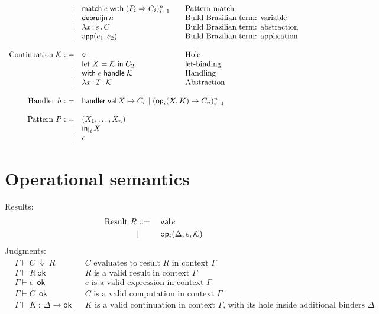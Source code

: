 \documentclass{article}
\newcommand{\G}{\Gamma}
\newcommand{\D}{\Delta}
\newcommand{\bnf}{\mathrel{{:}{:}{=}}}
\newcommand{\bnfor}{|}
\newcommand{\x}{x}     %
\newcommand{\C}{C}     %
\newcommand{\K}{K}     %
\newcommand{\X}{X}     %
\newcommand{\e}{e}     %
\newcommand{\rgn}{r}   %
\newcommand{\h}{h}     %
\newcommand{\T}{T}     %
\newcommand{\KK}{{\cal K}} %
\newcommand{\val}{\mathsf{val}\,} %
\newcommand{\letin}[1]{\mathsf{let}\; #1 \;\mathsf{in}\;} %
\newcommand{\opPat}[3][i]{\mathsf{op}_{#1}(#2, #3)} %
\newcommand{\opRes}[4][i]{\mathsf{op}_{#1}(#2, #3, #4)} %
\newcommand{\withhandle}[1]{\mathsf{with}\;#1\;\mathsf{handle}\;} %
\newcommand{\abs}[1]{\mathsf{abs}\;#1\;\mathsf{in}\;} %
\newcommand{\lam}[2]{\lambda #1 \,{:}\, #2 \,.\,} %
\newcommand{\handler}[6][n]{\mathsf{handler}\; \val #2 \mapsto #3 \mid (\opPat{#4}{#5} \mapsto #6_{#1})_{i=1}^{#1}}
\newcommand{\makeApp}[2]{\mathsf{app}(#1,#2)} %
\newcommand{\debruijn}[1]{\mathsf{debruijn}\,#1} %
\newcommand{\hole}{\diamond}
\newcommand{\tuple}[1]{(#1)}
\newcommand{\pat}{P}
\newcommand{\match}[2]{\mathsf{match}\; #1\; \mathsf{with}\;#2}
\newcommand{\genericPats}[1][n]{(\pat_i \Rightarrow \C_i)_{i=1}^n}
\newcommand{\genericmatch}[1][\e]{\match{#1}{\genericPats}}
\renewcommand{\c}{c} %
\newcommand{\inj}[2][i]{\mathsf{inj}_{#1}\, #2}
\newcommand{\evalto}[3][\G]{#1 \vdash #2 \ \Downarrow\  #3}
\newcommand{\resultok}[2][\G]{#1 \vdash #2 \ \mathsf{ok}}
\newcommand{\eok}[2][\G]{#1 \vdash #2 \ \ \mathsf{ok}}
\newcommand{\cok}[2][\G]{#1 \vdash #2 \ \ \mathsf{ok}}
\newcommand{\kok}[3][\G]{#1 \vdash #3 \ : \ #2\to\mathsf{ok}}
\newcommand{\typicalhandler}{\handler{\X}{\C_v}{\X}{\K}{\C}}
\begin{document}
\begin{equation*}
\begin{array}{rl@{\qquad}l}
    \bnfor  & \genericmatch& \text{Pattern-match}\\
    \bnfor  & \debruijn{n} & \text{Build Brazilian term: variable} \\
    \bnfor  & \lam{\x}{\e} \C   & \text{Build Brazilian term: abstraction} \\
    \bnfor  & \makeApp{\e_1}{\e_2} & \text{Build Brazilian term: application} \\
    \\
    \text{Continuation $\KK$} \bnf    & \hole                & \text{Hole} \\
    \bnfor  & \letin{\X = \KK} \C_2  & \text{$\mathsf{let}$-binding} \\
    \bnfor  & \withhandle{\e} \KK & \text{Handling} \\
    \bnfor  & \lam{\x}{\T}{\KK} & \text{Abstraction} \\
    \\

  \text{Handler $\h$}
  \bnf & \multicolumn{2}{l}{\typicalhandler}\\
  \\
  \text{Pattern $\pat$}
  \bnf & \tuple{\X_1,\ldots,\X_n}\\
  \bnfor & \inj{\X}\\
  \bnfor & \c\\
\end{array}
\end{equation*}



\section{Operational semantics}
\label{sec:oper-semant}

Results:
%
\begin{equation*}
  \text{Result $R$}
  \begin{aligned}[t]
    &\bnf   {} && \val \e \\
    &\bnfor {} && \opRes{\D}{\e}{\KK} \\
  \end{aligned}
\end{equation*}
%
Judgments:
%
\begin{align*}
  &\evalto[\G]{C}{R} &&\text{$C$ evaluates to result $R$ in context $\G$} \\
  &\resultok[\G]{R}  &&\text{$R$ is a valid result in context $\G$} \\
  &\eok[\G]{\e} &&\text{$\e$ is a valid expression in context $\G$} \\
  &\cok[\G]{\C} &&\text{$\C$ is a valid computation in context $\G$} \\
  &\kok[\G]{\D}{\K} &&\text{$\K$ is a valid continuation in context $\G$,
                              with its hole inside additional binders $\D$} \\
\end{align*}
%
\end{document}

